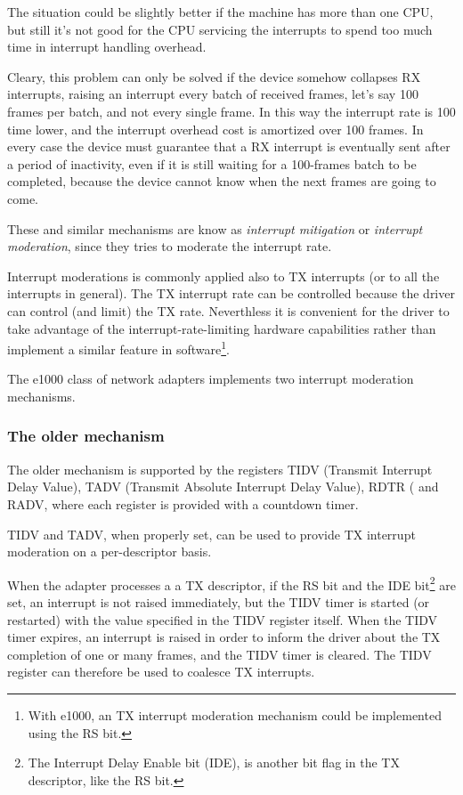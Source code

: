 The situation could be slightly better if the machine has more than one CPU, but still it's not good for the CPU servicing the interrupts
to spend too much time in interrupt handling overhead.

\vspace{0.5cm}

Cleary, this problem can only be solved if the device somehow collapses RX interrupts, raising an interrupt every batch of received
frames, let's say 100 frames per batch, and not every single frame. In this way the interrupt rate is 100 time lower, and the
interrupt overhead cost is amortized over 100 frames.
In every case the device must guarantee that a RX interrupt is eventually sent after a period of inactivity, even if it is still waiting
for a 100-frames batch to be completed, because the device cannot know when the next frames are going to come.

These and similar mechanisms are know as \emph{interrupt mitigation} or \emph{interrupt moderation}, since they tries to moderate the
interrupt rate.

Interrupt moderations is commonly applied also to TX interrupts (or to all the interrupts in general). The TX interrupt rate can be
controlled because the driver can control (and limit) the TX rate. Neverthless it is convenient for the driver to take advantage of
the interrupt-rate-limiting hardware capabilities rather than implement a similar feature in software\footnote{With e1000, an TX 
interrupt moderation mechanism could be implemented using the RS bit.}.

\vspace{0.5cm}

The e1000 class of network adapters implements two interrupt moderation mechanisms.

\subsubsection{The older mechanism}
The older mechanism is supported by the registers TIDV (Transmit Interrupt Delay Value), TADV (Transmit Absolute Interrupt Delay Value),
RDTR ( and RADV, where each register is provided with a countdown timer.

\vspace{0.5cm}

TIDV and TADV, when properly set, can be used to provide TX interrupt moderation on a per-descriptor basis.

When the adapter processes a a TX descriptor, if the RS bit and the IDE bit\footnote{The Interrupt Delay Enable bit (IDE), is another
bit flag in the TX descriptor, like the RS bit.} are set, an interrupt is not raised immediately, but the TIDV timer is started (or
restarted) with the value specified in the TIDV register itself. When the TIDV timer expires, an interrupt is raised in order
to inform the driver about the TX completion of one or many frames, and the TIDV timer is cleared.
The TIDV register can therefore be used to coalesce TX interrupts.

